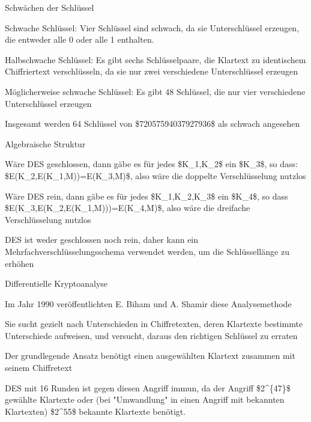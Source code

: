 \documentclass[a4paper]{article}
\begin{document}
\begin{multicols}{3}
      \begin{itemize*}
            \item Schwächen der Schlüssel
            \begin{itemize*}
                  \item Schwache Schlüssel: Vier Schlüssel sind schwach, da sie Unterschlüssel erzeugen, die entweder alle 0 oder alle 1 enthalten.
                  \item Halbschwache Schlüssel: Es gibt sechs Schlüsselpaare, die Klartext zu identischem Chiffriertext verschlüsseln, da sie nur zwei verschiedene Unterschlüssel erzeugen
                  \item Möglicherweise schwache Schlüssel: Es gibt 48 Schlüssel, die nur vier verschiedene Unterschlüssel erzeugen
                  \item Insgesamt werden 64 Schlüssel von \$72057594037927936\$ als schwach angesehen
            \end{itemize*}
            \item Algebraische Struktur
            \begin{itemize*}
                  \item Wäre DES geschlossen, dann gäbe es für jedes \$K\_1,K\_2\$ ein \$K\_3\$, so dass: \$E(K\_2,E(K\_1,M))=E(K\_3,M)\$, also wäre die doppelte Verschlüsselung nutzlos
                  \item Wäre DES rein, dann gäbe es für jedes \$K\_1,K\_2,K\_3\$ ein \$K\_4\$, so dass \$E(K\_3,E(K\_2,E(K\_1,M)))=E(K\_4,M)\$, also wäre die dreifache Verschlüsselung nutzlos
                  \item DES ist weder geschlossen noch rein, daher kann ein Mehrfachverschlüsselungsschema verwendet werden, um die Schlüssellänge zu erhöhen
            \end{itemize*}
            \item Differentielle Kryptoanalyse
            \begin{itemize*}
                  \item Im Jahr 1990 veröffentlichten E. Biham und A. Shamir diese Analysemethode
                  \item Sie sucht gezielt nach Unterschieden in Chiffretexten, deren Klartexte bestimmte Unterschiede aufweisen, und versucht, daraus den richtigen Schlüssel zu erraten
                  \item Der grundlegende Ansatz benötigt einen ausgewählten Klartext zusammen mit seinem Chiffretext
                  \item DES mit 16 Runden ist gegen diesen Angriff immun, da der Angriff \$2\^{}\{47\}\$ gewählte Klartexte oder (bei "Umwandlung" in einen Angriff mit bekannten Klartexten) \$2\^{}55\$ bekannte Klartexte benötigt.

\end{itemize*}
\end{itemize*}
\end{multicols}
\end{document}
